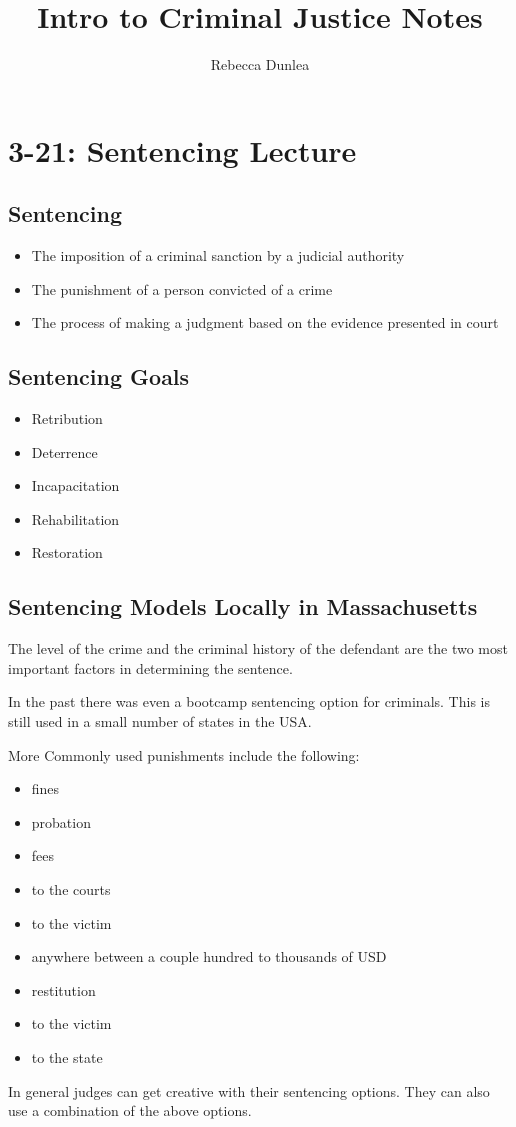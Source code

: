 \documentclass[10pt]{article}
\title{Intro to Criminal Justice Notes}
\author{Rebecca Dunlea}
\begin{document}
\maketitle
\section*{3-21: Sentencing Lecture}
\subsection*{Sentencing}
\begin{itemize}
  \item The imposition of a criminal sanction by a judicial authority
    \item The punishment of a person convicted of a crime
        \item The process of making a judgment based on the evidence presented in court
\end{itemize}
\subsection*{Sentencing Goals}
\begin{itemize}
  \item Retribution
    \item Deterrence
        \item Incapacitation
            \item Rehabilitation
                \item Restoration

\end{itemize}

\subsection*{Sentencing Models Locally in Massachusetts}
The level of the crime and the criminal history of the defendant are the two most important factors in determining the sentence.

In the past there was even a bootcamp sentencing option for criminals. This is still used in a small number of states in the USA.

More Commonly used punishments include the following:
\begin{itemize}
    \item fines
    \item probation
    \item fees
        \item to the courts
        \item to the victim
        \item anywhere between a couple hundred to thousands of USD
    \item restitution
        \item to the victim
        \item to the state
\end{itemize}
In general judges can get creative with their sentencing options. They can also use a combination of the above options.
\end{document}
